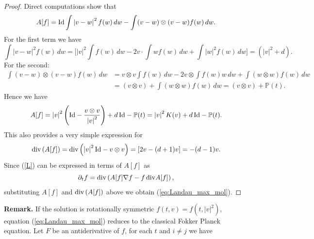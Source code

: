 \documentclass[11pt]{amsart}
\makeatletter
\def\subsection{\@startsection{subsection}{2}%
  \z@{.5\linespacing\@plus.7\linespacing}
{.5\baselineskip}%
  {\normalfont\centering\scshape}%
}
\numberwithin{equation}{section}
\makeatother
\begin{document}
\begin{proof}
Direct computations show that
  \begin{equation*}
    A[f]=\textnormal{Id}\int\left\vert v-w \right\vert ^{2}f(w)\,dw-\int(v-w)\otimes(v-w)f(w)\,dw.
  \end{equation*}
  For the first term we have
  \begin{equation*}
    \int\left\vert v-w \right\vert ^{2}f(w)\,dw=\Bigg[\left\vert v \right\vert ^{2}\int f(w)\,dw-2v\cdot\int wf(w)\,dw+\int\left\vert w \right\vert ^{2}f(w)\,dw\Bigg]=\left(\left\vert v \right\vert ^{2}+d\right).
  \end{equation*}
  For the second:
  \begin{align*}
    \int(v-w)\otimes(v-w)f(w)\,dw &= v\otimes v\int f(w)\,dw-2v\otimes\int f(w)w\,dw + \int\left(w\otimes w\right)f(w)\,dw \\
     &= (v\otimes v)+ \int\left(w\otimes w\right)f(w)\,dw = (v\otimes v)+\mathbb{P}(t).
  \end{align*}
 Hence we have
  \begin{equation*}
    A[f] = \left\vert v \right\vert ^{2}\Bigg(\textnormal{Id}-\frac{v\otimes v}{\left\vert v \right\vert ^{2}}\Bigg)+d\,\textnormal{Id} - \mathbb{P}(t) = \left\vert v \right\vert ^{2}K(v)+d\,\textnormal{Id} - \mathbb{P}(t).
  \end{equation*}
  This also provides a very simple expression for
  \begin{equation*}
    \textnormal{div}\left(A[f]\right)=\textnormal{div}\left(\left\vert v \right\vert ^{2}\textnormal{Id}-v\otimes v\right)
    =\left[2v-(d+1)v\right]=-(d-1)v.
  \end{equation*}
  Since (\ref{L}) can be expressed in terms of $A[f]$ as
  \begin{equation*}
    \partial_{t}f=\textnormal{div}\left(A[f]\nabla f-f\,\textnormal{div}A[f]\right),
  \end{equation*}
  substituting $ A[f] $ and $\textnormal{div}\left(A[f]\right)$ above we obtain (\ref{eq:Landau_max_mol}). 
\end{proof}
%
%
{\bf{Remark.}} If  the solution is rotationally symmetric $f(t,v)=f(t,\left\vert v \right\vert ^{2})$, equation (\ref{eq:Landau_max_mol}) reduces to the classical Fokker Planck equation. Let $F$ be an antiderivative of $f$, for each $t$ and $i\neq j$ we have
\end{document}
